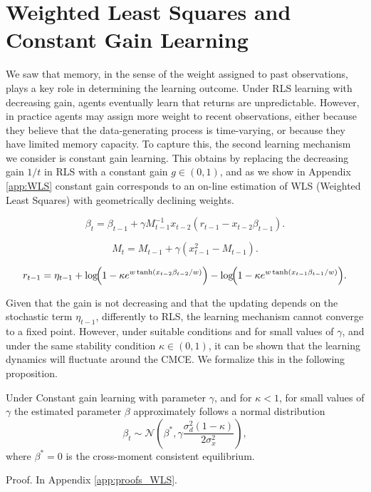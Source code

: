 \section{Weighted Least Squares and Constant Gain Learning}\label{sec:w_ls}

We saw that memory, in the sense of the weight assigned to past observations, plays a key role in determining the learning outcome.
Under RLS learning with decreasing gain, agents eventually learn that returns are unpredictable.
However, in practice agents may assign more weight to recent observations, either because they believe that the data-generating process is time-varying, or because they have limited memory capacity.
To capture this, the second learning mechanism we consider is constant gain learning.
This obtains by replacing the decreasing gain $1/t$ in RLS with a constant gain $g \in (0,1)$, and as we show in Appendix \ref{app:WLS} constant gain corresponds to an on-line estimation of WLS (Weighted Least Squares) with geometrically declining weights.

\begin{equation}
    \beta_t = \beta_{t-1} + \gamma M^{-1}_{t-1} x_{t-2} (r_{t-1} - x_{t-2} \beta_{t-1}).
\end{equation}

\begin{equation}
    M_t = M_{t-1} + \gamma \left(x_{t-1}^2 - M_{t-1} \right).
\end{equation}

\begin{equation}\label{eq:constant_gain_returns}
    r_{t-1} = \eta_{t-1}
    + \log\!\Bigl(1 - \kappa e^{w \tanh(x_{t-2} \beta_{t-2} / w)}\Bigr)
    - \log\!\Bigl(1 - \kappa e^{w \tanh(x_{t-1} \beta_{t-1} / w)}\Bigr).
\end{equation} 



Given that the gain is not decreasing and that the updating depends on the stochastic term $\eta_{t-1}$, differently to RLS, the learning mechanism cannot converge to a fixed point.
However, under suitable conditions and for small values of $\gamma$, and under the same stability condition $\kappa \in (0, 1)$, it can be shown that the learning dynamics will fluctuate around the CMCE.
We formalize this in the following proposition.
\begin{proposition} \label{prop:WLS_distribution}
    Under Constant gain learning with parameter $\gamma$, and for $\kappa < 1$, for small values of $\gamma$ the estimated parameter $\beta$ approximately follows a normal distribution
\begin{equation}
    \beta_t \sim \mathcal{N} \left(\beta^*, \gamma \frac{\sigma_d^2 (1 - \kappa)}{2 \sigma^2_x}\right),
\end{equation}
where $\beta^* = 0$ is the cross-moment consistent equilibrium.
\end{proposition}
Proof. In Appendix \ref{app:proofs_WLS}.

